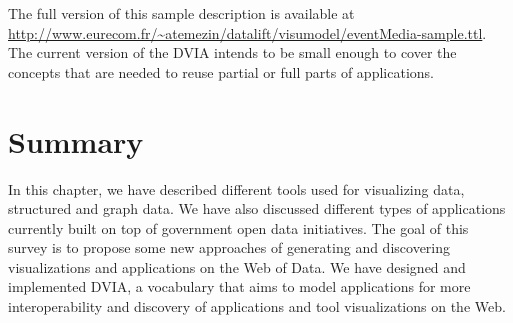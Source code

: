 The full version of this sample description is available at \url{http://www.eurecom.fr/~atemezin/datalift/visumodel/eventMedia-sample.ttl}. The current version of the DVIA intends to be small enough to cover the concepts that are needed to reuse partial or full parts of applications.

\section{Summary}
In this chapter, we have described different tools used for visualizing data, structured and graph data. We have also discussed different types of applications currently built on top of government open data initiatives. The goal of this survey is to propose some new approaches of generating and discovering visualizations and applications on the Web of Data. We have designed and implemented DVIA, a vocabulary that aims to model applications for more interoperability and discovery of applications and tool visualizations on the Web.

